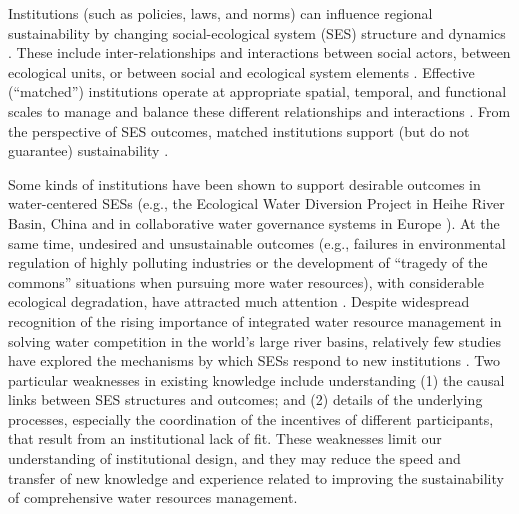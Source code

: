 \documentclass{article}
\begin{document}
Institutions (such as policies, laws, and norms) can influence regional sustainability by changing social-ecological system (SES) structure and dynamics \cite{youngInstitutionsenvironmentalchange2008,cummingAdvancingunderstandingnatural2020,lieninstitutionalgrammartool2020}.
These include inter-relationships and interactions between social actors, between ecological units, or between social and ecological system elements \cite{bodinCollaborativeenvironmentalgovernance2017,barnesSocialecologicalalignmentecological2019}.
Effective (“matched”) institutions operate at appropriate spatial, temporal, and functional scales to manage and balance these different relationships and interactions \cite{heWateringEnvironmentalRegulation2020,kellenbergempiricalinvestigationpollution2009}.
From the perspective of SES outcomes, matched institutions support (but do not guarantee) sustainability \cite{epsteinInstitutionalfitsustainability2015,wangAlignmentsocialecological2019}.

Some kinds of institutions have been shown to support desirable outcomes in water-centered SESs (e.g., the Ecological Water Diversion Project in Heihe River Basin, China \cite{wangAlignmentsocialecological2019} and in collaborative water governance systems in Europe \cite{greenEUWaterGovernance2013}).
At the same time, undesired and unsustainable outcomes (e.g., failures in environmental regulation of highly polluting industries or the development of “tragedy of the commons” situations when pursuing more water resources), with considerable ecological degradation, have attracted much attention \cite{saylesSocialecologicalnetworkanalysis2019,caiPollutingthyneighbor2016,castilla-rhoSocialtippingpoints2017}.
Despite widespread recognition of the rising importance of integrated water resource management in solving water competition in the world’s large river basins, relatively few studies have explored the mechanisms by which SESs respond to new institutions \cite{agrawalSustainableGovernanceCommonPool2003,pershaSocialEcologicalSynergy2011,agrawalCommonPropertyInstitutions2001}.
Two particular weaknesses in existing knowledge include understanding (1) the causal links between SES structures and outcomes; and (2) details of the underlying processes, especially the coordination of the incentives of different participants, that result from an institutional lack of fit. These weaknesses limit our understanding of institutional design, and they may reduce the speed and transfer of new knowledge and experience related to improving the sustainability of comprehensive water resources management.
\end{document}
